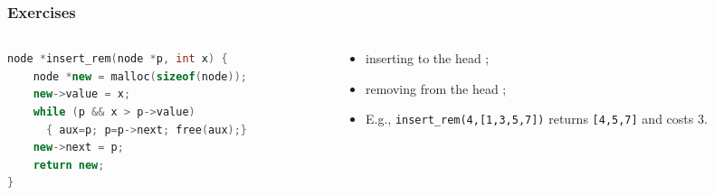 \documentclass[aspectratio=169]{beamer}
\begin{document}
\begin{frame}[fragile]\frametitle{Exercises}
    
\begin{columns}
\begin{column}{0.50\textwidth}
\begin{lstlisting}[language=C++,emph={insert_rem,malloc,free}]
  node *insert_rem(node *p, int x) {
    node *new = malloc(sizeof(node));
    new->value = x;
    while (p && x > p->value)
      { aux=p; p=p->next; free(aux);}
    new->next = p;
    return new;
}
\end{lstlisting}
\end{column}
\begin{column}{0.51\textwidth}
\begin{itemize}
    \item \alert{inserting} to the head ;
    \item \alert{removing} from the head ;
    \item E.g., \texttt{insert\_rem(4,[1,3,5,7])} returns \texttt{[4,5,7]} and costs 3.
  \end{itemize}
\end{column}
\end{columns}

~\\[-5mm]
~\\[-10mm]
~\\[-10mm]

\end{frame}
\end{document}

